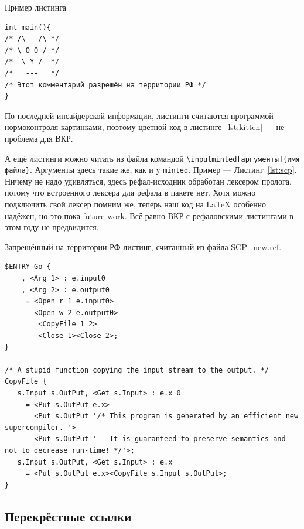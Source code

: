 \documentclass[14pt, russian]{scrartcl}
\begin{document}
\begin{listing}
\caption{Пример листинга}
\label{lst:kitten}
\begin{verbatim}
int main(){
/* /\---/\ */
/* \ O O / */
/*  \ Y /  */
/*   ---   */
/* Этот комментарий разрешён на территории РФ */
}
\end{verbatim}
\end{listing}

По последней инсайдерской информации, листинги считаются программой нормоконтроля картинками, поэтому цветной код в листинге~\ref{lst:kitten} --- не проблема для ВКР.

А ещё листинги можно читать из файла командой \texttt{\textbackslash inputminted[аргументы]\{имя файла\}}. Аргументы здесь такие же, как и у \texttt{minted}. Пример --- Листинг~\ref{lst:scp}. Ничему не надо удивляться, здесь рефал-исходник обработан лексером пролога, потому что встроенного лексера для рефала в пакете нет. Хотя можно подключить свой лексер \sout{помним же, теперь наш код на \LaTeX{} особенно надёжен}, но это пока future work. Всё равно ВКР с рефаловскими листингами в этом году не предвидится.

\begin{listing}[!htb]
\caption{Запрещённый на территории РФ листинг, считанный из файла SCP\_new.ref.}
\begin{verbatim}
$ENTRY Go {
    , <Arg 1> : e.input0 
    , <Arg 2> : e.output0
     = <Open r 1 e.input0>
       <Open w 2 e.output0>
        <CopyFile 1 2> 
        <Close 1><Close 2>;
}

/* A stupid function copying the input stream to the output. */
CopyFile {
   s.Input s.OutPut, <Get s.Input> : e.x 0
	 = <Put s.OutPut e.x>
	   <Put s.OutPut '/* This program is generated by an efficient new supercompiler. '>
	   <Put s.OutPut '   It is guaranteed to preserve semantics and not to decrease run-time! */'>;
   s.Input s.OutPut, <Get s.Input> : e.x
	 = <Put s.OutPut e.x><CopyFile s.Input s.OutPut>; 
}

\end{verbatim}
\label{lst:scp}
\end{listing}


\subsection{Перекрёстные ссылки}
\end{document}
